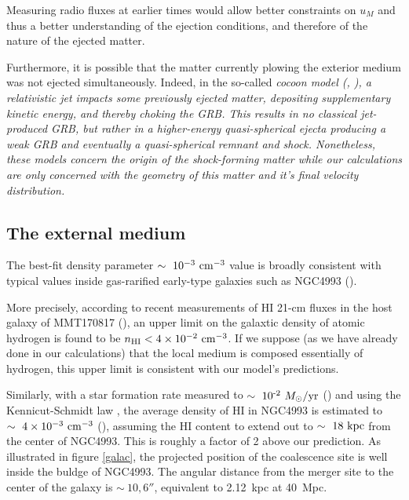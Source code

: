 

Measuring radio fluxes at earlier times would allow better constraints on $u_M$ and thus a better understanding of the ejection conditions, and therefore of the nature of the ejected matter.

Furthermore, it is possible that the matter currently plowing the exterior medium was not ejected simultaneously. Indeed, in the so-called \it{cocoon model} (\cite{42, 5}, ), a relativistic jet impacts some previously ejected matter, depositing supplementary kinetic energy, and thereby \it{choking} the GRB. This results in no classical jet-produced GRB, but rather in a higher-energy quasi-spherical ejecta producing a weak GRB and eventually a quasi-spherical remnant and shock. Nonetheless, these models concern the origin of the shock-forming matter while our calculations are only concerned with the geometry of this matter and it's final velocity distribution.


\subsection{The external medium}
The best-fit density parameter $\sim~10^{-3}~\rm{cm}^{-3}$ value is broadly consistent with typical values inside gas-rarified early-type galaxies such as NGC4993 (\cite{44}).

More precisely, according to recent measurements of HI 21-cm fluxes in the host galaxy of MMT170817 (\cite{12}), an upper limit on the galaxtic density of atomic hydrogen is found to be $n_{\rm{HI}} < 4 \times 10^{-2}~\rm{cm}^{-3}$. If we suppose (as we have already done in our calculations) that the local medium is composed essentially of hydrogen, this upper limit is consistent with our model's predictions.

Similarly, with a star formation rate measured to $\sim~10\sp{-2}~\Ms/\rm{yr}$ (\cite{9}) and using the Kennicut-Schmidt law  \cite{43}, the average density of HI in NGC4993 is estimated to $\sim~4 \times 10^{-3}~\rm{cm}^{-3}$ (\cite{12}), assuming the HI content to extend out to $\sim~18~\rm{kpc}$ from the center of NGC4993. This is roughly a factor of 2 above our prediction. As illustrated in figure \ref{galac}, the projected position of the coalescence site is well inside the buldge of NGC4993. The angular distance from the merger site to the center of the galaxy is $\sim~10,6''$, equivalent to 2.12~kpc at 40~Mpc.

